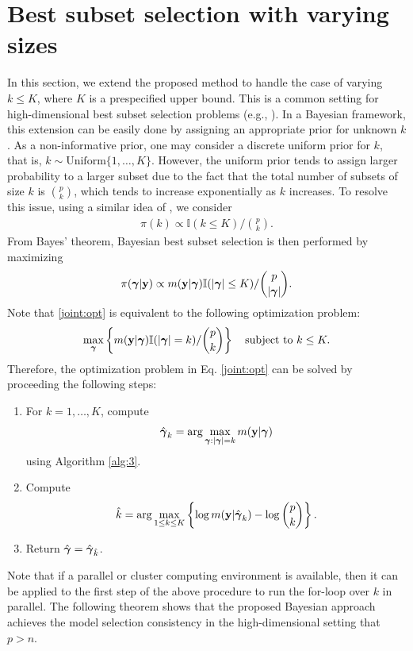 \section{Best subset selection with varying sizes}\label{sec:4}
In this section, we extend the proposed method to handle the case of varying $k \leq K$, where $K$ is a prespecified upper bound. This is a common setting for high-dimensional best subset selection problems (e.g., \citealt{bertsimas2016best, liang:2013bayesian}). In a Bayesian framework, this extension can be easily done by assigning an appropriate prior for unknown $k$. As a non-informative prior, one may consider a discrete uniform prior for $k$, that is, $k \sim \text{Uniform}\{1,\ldots,K\}$. However, the uniform prior tends to assign larger probability to a larger subset due to the fact that the total number of subsets of size $k$ is $\binom{p}{k}$, which tends to increase exponentially as $k$ increases. To resolve this issue, using a similar idea of \citet{chen2008extended}, we consider
\begin{eqnarray*}
\pi(k)\propto \mathbb{I}(k\leq K) / \binom{p}{k} .
\end{eqnarray*}
From Bayes' theorem, Bayesian best subset selection is then performed by maximizing
\begin{eqnarray}\label{joint:opt}
\pi({\boldsymbol \gamma}|{\bf y})\propto  m({\bf y}|{\boldsymbol \gamma})\mathbb{I}(|{\boldsymbol \gamma}|\leq K)/\binom{p}{|{\boldsymbol \gamma}|} .
\end{eqnarray}
Note that \eqref{joint:opt} is equivalent to the following optimization problem:
\begin{eqnarray*}
 \max_{{\boldsymbol \gamma}} \left\{m({\bf y}|{\boldsymbol \gamma})\mathbb{I}(|{\boldsymbol \gamma}|=k) /\binom{p}{k} \right\}  \quad \text{subject to }k\leq K.
 \end{eqnarray*}
Therefore, the optimization problem in Eq. \eqref{joint:opt} can be solved by proceeding the following steps:
\begin{enumerate}
\item For $k=1,\ldots,K$, compute $$\hat{{\boldsymbol \gamma}}_k= \arg\max_{{\boldsymbol \gamma}:|{\boldsymbol \gamma}|=k} m({\bf y}|{\boldsymbol \gamma})$$ using Algorithm \ref{alg:3}.
\item Compute $$ \hat{k}=\arg\max_{1\leq k \leq K} \left\{\log m({\bf y}|\hat{{\boldsymbol \gamma}}_k)-\log \binom{p}{k} \right\}.$$
\item Return $\hat{{\boldsymbol \gamma}}=\hat{{\boldsymbol \gamma}}_{\hat{k}}$.
\end{enumerate}
Note that if a parallel or cluster computing environment is available, then it can be applied to the first step of the above procedure to run the for-loop over $k$ in parallel. The following theorem shows that the proposed Bayesian approach achieves the model selection consistency in the high-dimensional setting that $p>n$.

